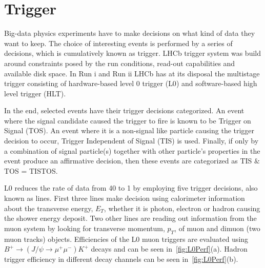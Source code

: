 \section{Trigger }
\label{triggerchap}
Big-data physics experiments have to make decisions on what kind of data they want to keep. The choice of interesting events is performed by a series of decisions, which is cumulatively known as trigger. \Gls{LHCb} trigger system was build around constraints posed by the run conditions, read-out capabilities and available disk space. In Run \Rn{1} and Run \Rn{2} \gls{LHCb} has at its disposal the multistage trigger consisting of hardware-based level 0 trigger (\Gls{L0}) and software-based high level trigger (\Gls{HLT}).

In the end, selected events have their trigger decisions categorized. An event where the signal candidate caused the trigger to fire is known to be Trigger on Signal (\Gls{TOS}). An event where it is a non-signal like particle causing the trigger decision to occur, Trigger Independent of Signal (\Gls{TIS}) is used. Finally, if only by a combination of signal particle(s) together with other particle's properties in the event produce an affirmative decision, then these events are categorized as \Gls{TIS} $\&$ \Gls{TOS} = \Gls{TISTOS}.

\Gls{L0} reduces the rate of data from 40 \mhz to 1 \mhz by employing five trigger decisions, also known as lines. First three lines make decision using calorimeter information about the transverse energy, $E_{T}$, whether it is photon, electron or hadron causing the shower energy deposit. Two other lines are reading out information from the muon system by looking for transverse momentum, $p_{T}$, of muon and dimuon (two muon tracks) objects. Efficiencies of the L0 muon triggers are evaluated using $B^{+} \rightarrow (J/\psi \rightarrow \mu^{+} \mu^{-}) K^{+}$ decays and can be seen in~\autoref{fig:L0Perf}(a). Hadron trigger efficiency in different decay channels can be seen in~\autoref{fig:L0Perf}(b). 


